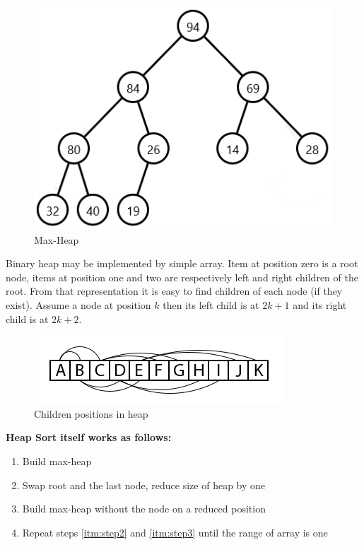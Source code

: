 \documentclass[
  field=inf,
  biblatex,
  language=english,
  glossaries,
  index
]{kidiplom}
\begin{document}
\begin{figure}[H]
\begin{center}
	
	\includegraphics[scale=0.7]{img/Maxheap.png}
	\caption{Max-Heap}\label{fig:maxheap}
\end{center}
\end{figure}

Binary heap may be implemented by simple array. Item at position zero is a root node, items at position one and two are respectively left and right children of the root. From that representation it is easy to find children of each node (if they exist). Assume a node at position $k$ then its left child is at $2k + 1$ and its right child is at $2k + 2$.

\begin{figure}[H]
\begin{center}
	
	\includegraphics[scale=3]{img/Heapsort.png}
	\caption{Children positions in heap}\label{fig:heapsort}
\end{center}
\end{figure}

\textbf{Heap Sort itself works as follows:}
\begin{enumerate}
 \item \label{itm:step1} Build max-heap
 \item \label{itm:step2} Swap root and the last node, reduce size of heap by one
 \item \label{itm:step3} Build max-heap without the node on a reduced position
 \item Repeat steps \ref{itm:step2} and \ref{itm:step3} until the range of array is one
\end{enumerate}
\end{document}
